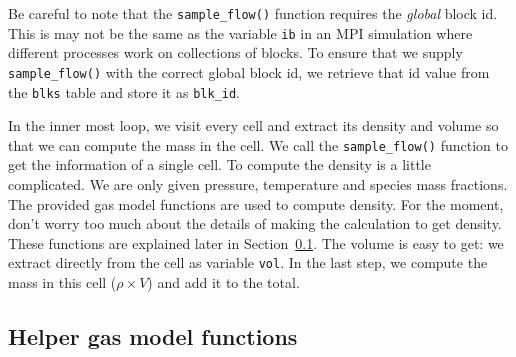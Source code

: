 Be careful to note that the \texttt{sample\_flow()}
function requires the \emph{global} block id.
This is may not be the same as the variable
\texttt{ib} in an MPI simulation where different
processes work on collections of blocks.
To ensure that we supply \texttt{sample\_flow()}
with the correct global block id, we retrieve
that id value from the \texttt{blks} table and store
it as \texttt{blk\_id}.

In the inner most loop, we visit every cell
and extract its density and volume so that we
can compute the mass in the cell.
We call the \verb!sample_flow()! function to get
the information of a single cell.
To compute the density is a little complicated.
We are only given pressure, temperature and 
species mass fractions.
The provided gas model functions are used
to compute density.
For the moment, don't worry too much about the
details of making the calculation to get density.
These functions are explained later in Section~\ref{sec:udf-gas-service}.
The volume is easy to get: we extract directly from the
cell as variable \verb!vol!.
In the last step, we compute the mass in this cell ($\rho \times V$)
and add it to the total.


\subsection{Helper gas model functions}
\label{sec:udf-gas-service}

